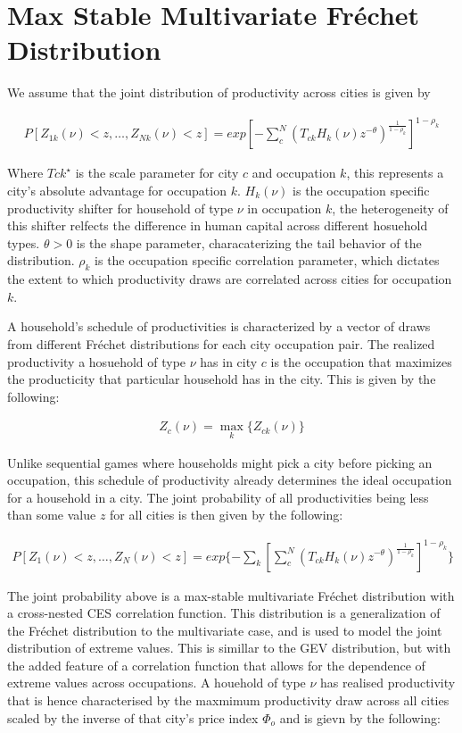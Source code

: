 \documentclass[10pt]{article}
\begin{document}
\section{Max Stable Multivariate Fréchet Distribution}

We assume that the joint distribution of productivity across cities is given by

\begin{align}
    P[Z_{1k}(\nu) < z, \dots, Z_{Nk} (\nu) < z] = exp[-\sum_{c}^{N}(T_{ck} H_k(\nu) z^{-\theta})^{\frac{1}{1 - \rho_k}}]^{1 - \rho_k}
\end{align}

Where $T{ck}^{\star}$ is the scale parameter for city $c$ and occupation $k$, this represents a city's absolute advantage for occupation $k$. $H_k(\nu)$ is the occupation specific productivity shifter for household of type $\nu$ in occupation $k$, the heterogeneity of this shifter relfects the difference in human capital across different hosuehold types. $\theta > 0$ is the shape parameter, characaterizing the tail behavior of the distribution. $\rho_k$ is the occupation specific correlation parameter, which dictates the extent to which productivity draws are correlated across cities for occupation $k$.

A household's schedule of productivities is characterized by a vector of draws from different Fréchet distributions for each city occupation pair. The realized productivity a hosuehold of type $\nu$ has in city $c$ is the occupation that maximizes the producticity that particular household has in the city. This is given by the following:

\begin{align}
    Z_c(\nu) = \max_{k} \{Z_{ck}(\nu)\}
\end{align}

Unlike sequential games where households might pick a city before picking an occupation, this schedule of productivity already determines the ideal occupation for a household in a city. The joint probability of all productivities being less than some value $z$ for all cities is then given by the following:

\begin{align}
    P[Z_1(\nu) < z, \dots, Z_N(\nu) < z] = exp\{- \sum_{k}^{}[\sum_{c}^{N}(T_{ck} H_k(\nu) z^{-\theta})^{\frac{1}{1 - \rho_k}}]^{1 - \rho_k}\}
\end{align}

The joint probability above is a max-stable multivariate Fréchet distribution with a cross-nested CES correlation function. This distribution is a generalization of the Fréchet distribution to the multivariate case, and is used to model the joint distribution of extreme values. This is simillar to the GEV distribution, but with the added feature of a correlation function that allows for the dependence of extreme values across occupations. A houehold of type $\nu$ has realised productivity that is hence characterised by the maxmimum productivity draw across all cities scaled by the inverse of that city's price index $\Phi_o$ and is gievn by the following:
\end{document}
